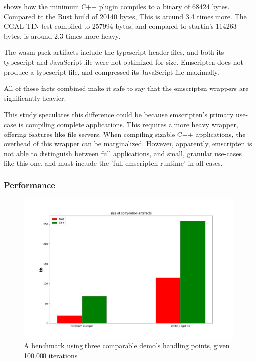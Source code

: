  shows how the minimum C++ plugin compiles to a binary of 68424 bytes. 
Compared to the Rust build of 20140 bytes, This is around 3.4 times more. 
The CGAL TIN test compiled to 257994 bytes, and compared to startin's 114263 bytes, is around 2.3 times more heavy.

The wasm-pack artifacts include the typescript header files, and both its typescript and JavaScript file were not optimized for size.
Emscripten does not produce a typescript file, and compressed its JavaScript file maximally. 

All of these facts combined make it safe to say that the emscripten wrappers are significantly heavier.

This study speculates this difference could be because emscripten's primary use-case is compiling complete applications. 
This requires a more heavy wrapper, offering features like file servers. 
When compiling sizable C++ applications, the overhead of this wrapper can be marginalized.
However, apparently, emscripten is not able to distinguish between full applications, and small, granular use-cases like this one, and must include the 'full emscripten runtime' in all cases.

\subsubsection*{Performance}

\begin{figure}
  \graphicspath{{../../assets/plots/rust-cpp-compilation-size/}}
  \centering
  \includegraphics[width=\linewidth]{figure.png}
  \caption[]{A benchmark using three comparable demo's handling points, given 100.000 iterations}
  \label{fig:rust-cpp-performance}
\end{figure}

